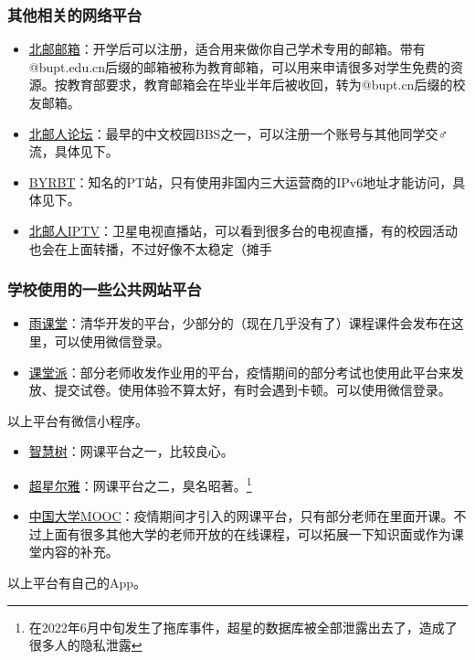 \subsubsection*{其他相关的网络平台}
\begin{itemize}
    \item \href{https://mail.bupt.edu.cn/}{北邮邮箱}：开学后可以注册，适合用来做你自己学术专用的邮箱。带有@bupt.edu.cn后缀的邮箱被称为教育邮箱，可以用来申请很多对学生免费的资源。按教育部要求，教育邮箱会在毕业半年后被收回，转为@bupt.cn后缀的校友邮箱。
    \item \href{https://bbs.byr.cn/}{北邮人论坛}：最早的中文校园BBS之一，可以注册一个账号与其他同学交♂流，具体见下。
    \item \href{https://byr.pt/}{BYRBT}：知名的PT站，只有使用非国内三大运营商的IPv6地址才能访问，具体见下。
    \item \href{http://tv.byr.cn/show}{北邮人IPTV}：卫星电视直播站，可以看到很多台的电视直播，有的校园活动也会在上面转播，不过好像不太稳定（摊手
\end{itemize}

\subsubsection*{学校使用的一些公共网站平台}
\begin{itemize}
    \item \href{https://www.yuketang.cn/web}{雨课堂}：清华开发的平台，少部分的（现在几乎没有了）课程课件会发布在这里，可以使用微信登录。
    \item \href{https://www.ketangpai.com/}{课堂派}：部分老师收发作业用的平台，疫情期间的部分考试也使用此平台来发放、提交试卷。使用体验不算太好，有时会遇到卡顿。可以使用微信登录。
\end{itemize}
以上平台有微信小程序。
\begin{itemize}
    \item \href{https://passport.zhihuishu.com/}{智慧树}：网课平台之一，比较良心。
    \item \href{http://erya.mooc.chaoxing.com/}{超星尔雅}：网课平台之二，臭名昭著。\footnote{在2022年6月中旬发生了拖库事件，超星的数据库被全部泄露出去了，造成了很多人的隐私泄露}
    \item \href{https://www.icourse163.org/learn}{中国大学MOOC}：疫情期间才引入的网课平台，只有部分老师在里面开课。不过上面有很多其他大学的老师开放的在线课程，可以拓展一下知识面或作为课堂内容的补充。
\end{itemize}
以上平台有自己的App。

